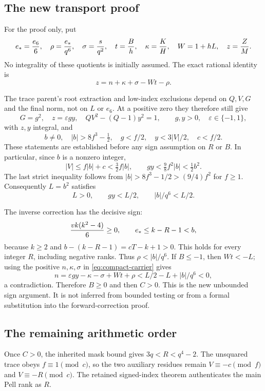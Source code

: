\documentclass[11pt]{article}
\begin{document}
\subsection{The new transport proof}

For the proof only, put
\[
 e_*={e_6\over6},\quad \rho={e_*\over q^6},\quad
 \sigma={s\over q^2},\quad t={B\over h},\quad
 \kappa={K\over H},\quad W=1+hL,\quad z={Z\over M}.
\]
No integrality of these quotients is initially assumed.  The exact
rational identity is
\begin{equation}
 z=n+\kappa+\sigma-Wt-\rho.\label{eq:compact-carrier}
\end{equation}

The trace parent's root extraction and low-index exclusions depend on
$Q,V,G$ and the final norm, not on $L$ or $e_6$.
At a positive zero they therefore still give
\[
 G=g^2,\quad z=\varepsilon gy,\quad
 QV^2-(Q-1)y^2=1,\qquad g,y>0,\quad\varepsilon\in\{-1,1\},
\]
with $z,y$ integral, and
\[
 b\ne0,\quad |b|>8f^3-\tfrac12,\quad
 g<f/2,\quad y<3|V|/2,\quad c<f/2.
\]
These statements are established before any sign assumption on $R$ or $B$.
In particular, since $b$ is a nonzero integer,
\[
 |V|\le f|b|+c<\tfrac32 f|b|,
 \qquad
 gy<\tfrac98 f^2|b|<\tfrac12 b^2.
\]
The last strict inequality follows from
$|b|>8f^3-1/2>(9/4)f^2$ for $f\ge1$.
Consequently $L=b^2$ satisfies
\[
 L>0,\qquad gy<L/2,\qquad |b|/q^6<L/2.
\]

The inverse correction has the decisive sign:
\[
 {vk(k^2-4)\over6}\ge0,
 \qquad e_*\le k-R-1<b,
\]
because $k\ge2$ and $b-(k-R-1)=cT-k+1>0$.
This holds for every integer $R$, including negative ranks.  Thus
$\rho<|b|/q^6$.  If $B\le-1$, then $Wt<-L$; using the positive
$n,\kappa,\sigma$ in \eqref{eq:compact-carrier} gives
\[
 n=\varepsilon gy-\kappa-\sigma+Wt+\rho
   <L/2-L+|b|/q^6<0,
\]
a contradiction.  Therefore $B\ge0$ and then $C>0$.
This is the new unbounded sign argument.  It is not inferred from
bounded testing or from a formal substitution into the forward-correction
proof.

\subsection{The remaining arithmetic order}

Once $C>0$, the inherited mask bound gives $3q<R<q^4-2$.
The unsquared trace obeys $f\equiv1\pmod c$, so the two auxiliary
residues remain
$V\equiv-c\pmod f$ and $V\equiv-R\pmod c$.
The retained signed-index theorem authenticates the main Pell rank as $R$.
\end{document}
